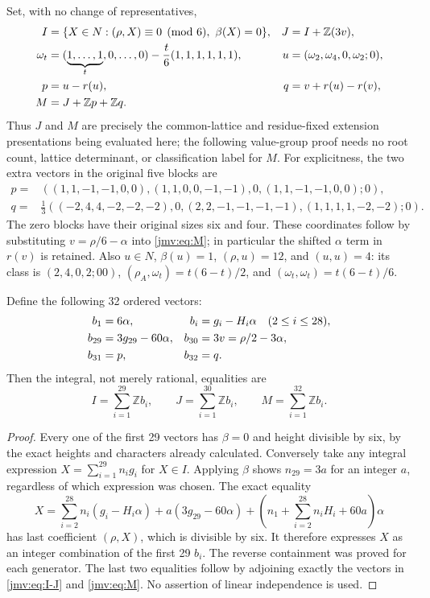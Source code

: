 Set, with no change of representatives,
\begin{align}
 I&=\{X\in N:(\rho,X)\equiv0\pmod6,\ \beta(X)=0\},
       &J&=I+\mathbb Z(3v),\label{jmv:eq:I-J}\\
 \omega_t&=(\underbrace{1,\ldots,1}_{t},0,\ldots,0)
                    -\frac t6(1,1,1,1,1,1),
       &u&=(\omega_2,\omega_4,0,\omega_2;0),\notag\\
 p&=u-r(u),&q&=v+r(u)-r(v),\notag\\
 M&=J+\mathbb Zp+\mathbb Zq.&&\label{jmv:eq:M}
\end{align}
Thus \(J\) and \(M\) are precisely the common-lattice and
residue-fixed extension presentations being evaluated here; the
following value-group proof needs no root count, lattice determinant,
or classification label for \(M\). For explicitness, the two extra
vectors in the original five blocks are
\begin{align*}
 p={}&((1,1,-1,-1,0,0),(1,1,0,0,-1,-1),0,
                         (1,1,-1,-1,0,0);0),\\
 q={}&\tfrac13((-2,4,4,-2,-2,-2),0,(2,2,-1,-1,-1,-1),
                         (1,1,1,1,-2,-2);0).
\end{align*}
The zero blocks have their original sizes six and four. These
coordinates follow by substituting \(v=\rho/6-\alpha\) into
\eqref{jmv:eq:M}; in particular the shifted \(\alpha\) term in
\(r(v)\) is retained. Also \(u\in N\),
\(\beta(u)=1\), \((\rho,u)=12\), and \((u,u)=4\):
its class is \((2,4,0,2;00)\),
\((\rho_A,\omega_t)=t(6-t)/2\), and
\((\omega_t,\omega_t)=t(6-t)/6\).

\begin{theorem}
\label{jmv:thm:IJM-generators}
Define the following 32 ordered vectors:
\begin{align}
 b_1&=6\alpha,&
 b_i&=g_i-H_i\alpha\quad(2\leq i\leq28),\notag\\
 b_{29}&=3g_{29}-60\alpha,&
 b_{30}&=3v=\rho/2-3\alpha,\notag\\
 b_{31}&=p,&b_{32}&=q.\label{jmv:eq:IJM-generators}
\end{align}
Then the integral, not merely rational, equalities are
\[
 I=\sum_{i=1}^{29}\mathbb Zb_i,\qquad
 J=\sum_{i=1}^{30}\mathbb Zb_i,\qquad
 M=\sum_{i=1}^{32}\mathbb Zb_i.
\]
\end{theorem}
\begin{proof}
Every one of the first 29 vectors has \(\beta=0\) and height
divisible by six, by the exact heights and characters already
calculated. Conversely take any integral expression
\(X=\sum_{i=1}^{29}n_ig_i\) for \(X\in I\). Applying
\(\beta\) shows \(n_{29}=3a\) for an integer \(a\),
regardless of which expression was chosen. The exact equality
\[
 X=\sum_{i=2}^{28}n_i(g_i-H_i\alpha)
        +a(3g_{29}-60\alpha)
        +\left(n_1+\sum_{i=2}^{28}n_iH_i+60a\right)\alpha
\]
has last coefficient \((\rho,X)\), which is divisible by six.
It therefore expresses \(X\) as an integer combination of the
first 29 \(b_i\). The reverse containment was proved for each
generator. The last two equalities follow by adjoining exactly
the vectors in \eqref{jmv:eq:I-J} and \eqref{jmv:eq:M}.
No assertion of linear independence is used.
\end{proof}

